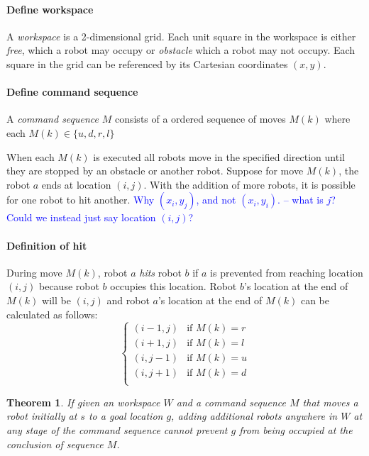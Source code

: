\documentclass[letterpaper, 10 pt, conference]{ieeeconf}
\newtheorem{theorem}{Theorem}
\begin{document}
\paragraph{Define workspace} A \emph{workspace} is a 2-dimensional grid. Each unit square in the workspace is either  \emph{free}, which a robot may occupy or \emph{obstacle} which a robot may not occupy.  Each square in the grid can be referenced by its Cartesian coordinates $(x,y)$. %


\paragraph {Define command sequence}A \emph{command sequence} $M$ consists of a ordered sequence of moves $M(k)$ where each $M(k)\in\{u,d,r,l\}$ 

When each $M(k)$ is executed all robots move in the specified direction until they are stopped by an obstacle or another robot. Suppose for  move $M(k)$, the robot $a$ ends at location $(i,j)$. With the addition of more robots,  it is possible for one robot to hit another.
\textcolor{blue}{Why $(x_i,y_j)$, and not $(x_i,y_i)$. -- what is $j$?  Could we instead just say location $(i,j)$?}
\paragraph{Definition of hit}
During move $M(k)$, robot $a$ \emph{hits} robot $b$ if $a$ is prevented from reaching location $(i,j)$ because robot $b$ occupies this location. Robot $b$'s location at the end of $M(k)$ will be $(i,j)$ and robot $a$'s location at the end of $M(k)$ can be calculated as follows:
\begin{displaymath}
    \left\{
     \begin{array}{lr}
       (i-1,j) & \text{if }M(k)=r\\
       (i+1,j) &\text{if }M(k)=l\\
       (i,j-1) &\text{if }M(k)=u\\
       (i,j+1) & \text{if }M(k)=d\\
     \end{array}
   \right.
\end{displaymath} 



\begin{theorem}\label{thm:AdditionalRobotsCannotPreventAnOccupation} %
If given an workspace $W$ and a command sequence $M$ that moves a robot initially at $s$ to a goal location $g$, adding additional robots anywhere in $W$ at any stage of the command sequence cannot prevent $g$ from being occupied at the conclusion of sequence $M$.
\end{theorem}
\end{document}
